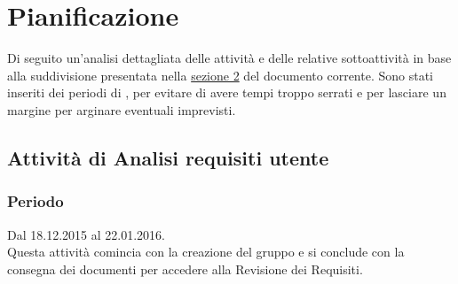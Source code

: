 \documentclass[a4paper, titlepage]{article}
\begin{document}
	\newpage
	\section {Pianificazione}\label{Pianificazione}
	Di seguito un'analisi dettagliata delle attività e delle relative sottoattività in base alla suddivisione presentata nella \hyperref[Ciclo di vita]{sezione 2} del documento corrente.
	Sono stati inseriti dei periodi di , per evitare di avere tempi troppo serrati e per lasciare un margine per arginare eventuali imprevisti.
	
	\subsection{Attività  di Analisi requisiti utente}
	\subsubsection{Periodo}
	Dal 18.12.2015 al 22.01.2016.\\
	Questa attività comincia con la creazione del gruppo e si conclude con la consegna dei documenti per accedere alla Revisione dei Requisiti.
	
\end{document}
